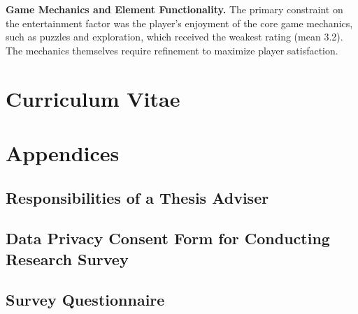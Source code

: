 \documentclass{research}
\begin{document}
\textbf{Game Mechanics and Element Functionality.} The primary constraint on the
entertainment factor was the player's enjoyment of the core game mechanics, such as
puzzles and exploration, which received the weakest rating (mean 3.2). The mechanics
themselves require refinement to maximize player satisfaction.

\clearpage




\clearpage

\chapter*{Curriculum Vitae}


\clearpage

\chapter*{Appendices}

\section*{Responsibilities of a Thesis Adviser}


\section*{Data Privacy Consent Form for Conducting Research Survey}


\section*{Survey Questionnaire}
\end{document}
